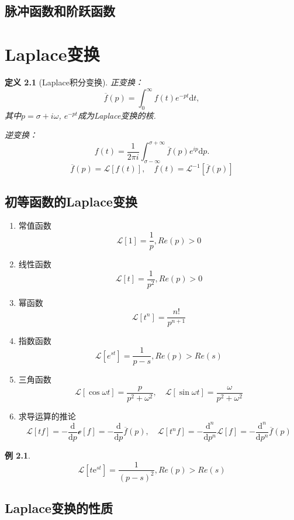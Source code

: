 \documentclass[11pt, a4paper, twoside]{ctexbook}
\newtheorem{definition}[theorem]{定义}
\newtheorem{example}[theorem]{例}
\begin{document}
\section{脉冲函数和阶跃函数}
\renewcommand{\cleardoublepage}{}
\renewcommand{\clearpage}{}
\chapter{Laplace变换}
\begin{definition}[Laplace积分变换]

    正变换：$$\overline{f}(p) = \int_0^{\infty}f(t)e^{-pt}\mathrm{d}t,$$
    其中$p = \sigma + i \omega $, $e^{-pt}$成为Laplace变换的核.

    逆变换：$$f(t) = \frac{1}{2\pi i}\int_{\sigma-\infty}^{\sigma + \infty}\overline{f}(p)e^{ip}\mathrm{d}p.$$
    $$\overline{f}(p) = \mathscr{L}[f(t)], \quad f(t) = \mathscr{L}^{-1}[\overline{f}(p)]$$
\end{definition}
\section{初等函数的Laplace变换}
\begin{enumerate}
    \item 常值函数 $$\mathscr{L}[1] = \frac{1}{p}, Re(p) > 0$$
    \item 线性函数 $$\mathscr{L}[t] = \frac{1}{p^2}, Re(p) > 0$$
    \item 幂函数 $$\mathscr{L}[t^n] = \frac{n!}{p^{n+1}}$$
    \item 指数函数 $$\mathscr{L}[e^{st}] = \frac{1}{p-s}, Re(p) > Re(s)$$
    \item 三角函数 $$\mathscr{L}[\cos \omega t] = \frac{p}{p^2 +\omega^2},\quad\mathscr{L}[\sin \omega t] = \frac{\omega}{p^2 +\omega^2} $$
    \item 求导运算的推论 $$\mathscr{L}[tf] = -\frac{\mathrm{d}}{\mathrm{d}p}\mathscr{e}[f] = -\frac{\mathrm{d}}{\mathrm{d}p} \overline{f}(p), \quad \mathscr{L}[t^nf] = -\frac{\mathrm{d}^n}{\mathrm{d}p^n}\mathscr{L}[f] = -\frac{\mathrm{d}^n}{\mathrm{d}p^n} \overline{f}(p)$$ 
\end{enumerate}
\begin{example}
    $$\mathscr{L}\left[t\mathrm{e}^{st}\right] = \frac{1}{(p-s)^2}, Re(p) > Re(s)$$
\end{example}
\section{Laplace变换的性质}
\end{document}
